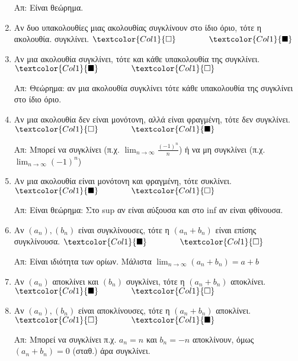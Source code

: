\begin{enumerate}[itemsep=.5\baselineskip]
    Απ: Είναι θεώρημα. 

  \item \textcolor{Col1}{Αν δυο υπακολουθίες μιας ακολουθίας συγκλίνουν στο ίδιο όριο,
    τότε η ακολουθία}.
    συγκλίνει.
    \hfill $\textcolor{Col1}{\square} \qquad \qquad \textcolor{Col1}{\blacksquare}$

  \item \textcolor{Col1}{Αν μια ακολουθία συγκλίνει, τότε και κάθε υπακολουθία της
    συγκλίνει}.
    \hfill $\textcolor{Col1}{\blacksquare} \qquad \qquad \textcolor{Col1}{\square}$

    Απ: Θεώρημα: αν μια ακολουθία συγκλίνει τότε κάθε υπακολουθία της συγκλίνει 
    στο ίδιο όριο. 

  \item \textcolor{Col1}{Αν μια ακολουθία δεν είναι μονότονη, αλλά είναι φραγμένη, τότε
    δεν συγκλίνει}.
    \hfill $\textcolor{Col1}{\square} \qquad \qquad \textcolor{Col1}{\blacksquare}$

    Απ: Μπορεί να συγκλίνει (π.χ. $ \lim_{n \to \infty} \frac{(-1)^{n}}{n} $) ή 
    να μη συγκλίνει (π.χ. $ \lim_{n \to \infty} (-1)^{n} $)

  \item \textcolor{Col1}{Αν μια ακολουθία είναι μονότονη και φραγμένη, τότε συκλίνει}.
    \hfill $\textcolor{Col1}{\blacksquare} \qquad \qquad \textcolor{Col1}{\square}$

    Απ: Είναι θεώρημα: Στο sup αν είναι αύξουσα και στο inf αν είναι φθίνουσα.

  \item \textcolor{Col1}{Αν $ (a_{n}), (b_{n}) $ είναι συγκλίνουσες, τότε η 
      $(a_{n}+b_{n})$ είναι επίσης συγκλίνουσα}.
    \hfill $\textcolor{Col1}{\blacksquare} \qquad \qquad \textcolor{Col1}{\square}$

    Απ: Είναι ιδιότητα των ορίων. Μάλιστα $ \lim_{n \to \infty} (a_{n}+b_{n}) =a+b $

  \item \textcolor{Col1}{Αν $ (a_{n}) $ αποκλίνει και $ (b_{n}) $ συγκλίνει, τότε η $
    (a_{n}+b_{n}) $ αποκλίνει}.
    \hfill $\textcolor{Col1}{\blacksquare} \qquad \qquad \textcolor{Col1}{\square}$

  \item \textcolor{Col1}{Αν $ (a_{n}), (b_{n}) $ είναι αποκλίνουσες, τότε η
    $(a_{n}+b_{n})$ αποκλίνει}.
    \hfill $\textcolor{Col1}{\square} \qquad \qquad \textcolor{Col1}{\blacksquare}$

    Απ: Μπορεί να συγκλίνει π.χ. $ a_{n}= n $ και $ b_{n}=-n $ αποκλίνουν, 
    όμως $ (a_{n}+b_{n})=0 $ (σταθ.) άρα συγκλίνει.


\end{enumerate}
